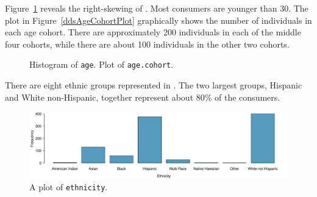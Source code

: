 \textD{\newpage}

Figure~\ref{ddsAge} reveals the right-skewing of . Most consumers are younger than 30. The plot in Figure~\ref{ddsAgeCohortPlot} graphically shows the number of individuals in each age cohort. There are approximately 200 individuals in each of the middle four cohorts, while there are about 100 individuals in the other two cohorts.

\begin{figure}[ht]
	\centering
	\caption{ Histogram of \texttt{age}.  Plot of \texttt{age.cohort}.}
	\label{ddsAge}
\end{figure}

There are eight ethnic groups represented in . The two largest groups, Hispanic and White non-Hispanic, together represent about 80\% of the consumers.

\begin{figure}[h]
	\centering
	\includegraphics[width=\textwidth]{ch_intro_to_data_oi_biostat/figures/ddsEthnicityPlot/ddsEthnicityPlot}
	\caption{A plot of \texttt{ethnicity}. }
	\label{ddsEthnicityPlot}
\end{figure}

